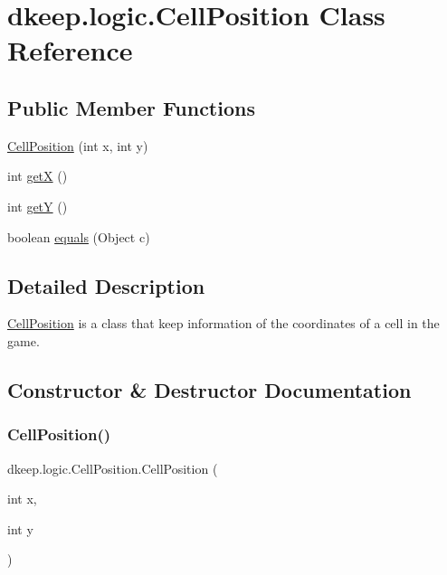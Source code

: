 \hypertarget{classdkeep_1_1logic_1_1_cell_position}{}\section{dkeep.\+logic.\+Cell\+Position Class Reference}
\label{classdkeep_1_1logic_1_1_cell_position}
\subsection*{Public Member Functions}
\begin{DoxyCompactItemize}
\item 
\hyperlink{classdkeep_1_1logic_1_1_cell_position_a4ec26832d4bcf19759b1eb6df1ec64a8}{Cell\+Position} (int x, int y)
\item 
int \hyperlink{classdkeep_1_1logic_1_1_cell_position_a12e6d155288b9f263dfca84369ff46ce}{getX} ()
\item 
int \hyperlink{classdkeep_1_1logic_1_1_cell_position_aaf1787de163be74c6c284562911e5ca5}{getY} ()
\item 
boolean \hyperlink{classdkeep_1_1logic_1_1_cell_position_a34989dd6791daf03e71ded888b5d8ac0}{equals} (Object c)
\end{DoxyCompactItemize}


\subsection{Detailed Description}
\hyperlink{classdkeep_1_1logic_1_1_cell_position}{Cell\+Position} is a class that keep information of the coordinates of a cell in the game. 

\subsection{Constructor \& Destructor Documentation}
\mbox{\label{classdkeep_1_1logic_1_1_cell_position_a4ec26832d4bcf19759b1eb6df1ec64a8}} 
\subsubsection{\texorpdfstring{Cell\+Position()}{CellPosition()}}
{\footnotesize\ttfamily dkeep.\+logic.\+Cell\+Position.\+Cell\+Position (\begin{DoxyParamCaption}\item[{int}]{x,  }\item[{int}]{y }\end{DoxyParamCaption})}

